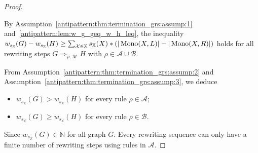 
\begin{proof} 
    \label{antipattern:proof:thm:termination_grs}
    
    By Assumption~\eqref{antipattern:thm:termination_grs:assump:1} and~\autoref{antipattern:lem:w_g_geq_w_h_leq}, the inequality \(
        w_{s_\mathbb{X}}(G) - w_{s_\mathbb{X}}(H) 
        \geq 
        \sum_{\mathcal{X} \in \mathbb{X}}^{}s_\mathbb{X}(X) * \left( 
            |\operatorname{Mono}(X,L)| -
            |\operatorname{Mono}(X,R)|
            \right)
    \) holds for all rewriting steps $G \Rightarrow_{\rho, \mathcal{M}} H$  with $\rho \in \mathcal{A} \cup \mathcal{B}$.
    
    \noindent From Assumption~\eqref{antipattern:thm:termination_grs:assump:2} and Assumption~\eqref{antipattern:thm:termination_grs:assump:3}, we deduce 
    \begin{itemize}
        \item \( w_{s_\mathbb{X}}(G) > w_{s_\mathbb{X}}(H) \) for every rule \(\rho \in \mathcal{A}\);
        \item  \( w_{s_\mathbb{X}}(G) \geq w_{s_\mathbb{X}}(H) \) for every rule \(\rho \in \mathcal{B}\).
    \end{itemize}
    Since $w_{s_\mathbb{X}}(G) \in \mathbb{N}$ for all graph $G$. Every rewriting sequence can only have a finite number of rewriting steps using rules in $\mathcal{A}$.
\end{proof} 